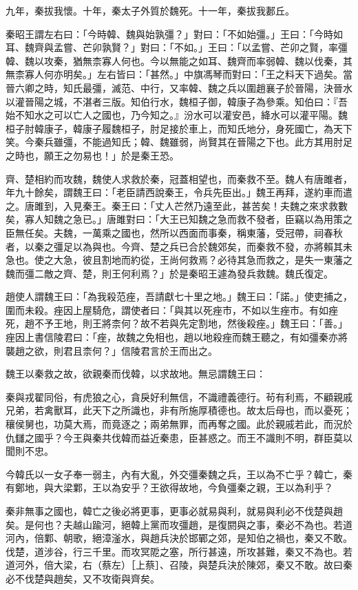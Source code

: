 \begin{pinyinscope}
九年，秦拔我懷。十年，秦太子外質於魏死。十一年，秦拔我郪丘。

秦昭王謂左右曰：「今時韓、魏與始孰彊？」對曰：「不如始彊。」王曰：「今時如耳、魏齊與孟嘗、芒卯孰賢？」對曰：「不如。」王曰：「以孟嘗、芒卯之賢，率彊韓、魏以攻秦，猶無柰寡人何也。今以無能之如耳、魏齊而率弱韓、魏以伐秦，其無柰寡人何亦明矣。」左右皆曰：「甚然。」中旗馮琴而對曰：「王之料天下過矣。當晉六卿之時，知氏最彊，滅范、中行，又率韓、魏之兵以圍趙襄子於晉陽，決晉水以灌晉陽之城，不湛者三版。知伯行水，魏桓子御，韓康子為參乘。知伯曰：『吾始不知水之可以亡人之國也，乃今知之。』汾水可以灌安邑，絳水可以灌平陽。魏桓子肘韓康子，韓康子履魏桓子，肘足接於車上，而知氏地分，身死國亡，為天下笑。今秦兵雖彊，不能過知氏；韓、魏雖弱，尚賢其在晉陽之下也。此方其用肘足之時也，願王之勿易也！」於是秦王恐。

齊、楚相約而攻魏，魏使人求救於秦，冠蓋相望也，而秦救不至。魏人有唐雎者，年九十餘矣，謂魏王曰：「老臣請西說秦王，令兵先臣出。」魏王再拜，遂約車而遣之。唐雎到，入見秦王。秦王曰：「丈人芒然乃遠至此，甚苦矣！夫魏之來求救數矣，寡人知魏之急已。」唐雎對曰：「大王已知魏之急而救不發者，臣竊以為用策之臣無任矣。夫魏，一萬乘之國也，然所以西面而事秦，稱東藩，受冠帶，祠春秋者，以秦之彊足以為與也。今齊、楚之兵已合於魏郊矣，而秦救不發，亦將賴其未急也。使之大急，彼且割地而約從，王尚何救焉？必待其急而救之，是失一東藩之魏而彊二敵之齊、楚，則王何利焉？」於是秦昭王遽為發兵救魏。魏氏復定。

趙使人謂魏王曰：「為我殺范痤，吾請獻七十里之地。」魏王曰：「諾。」使吏捕之，圍而未殺。痤因上屋騎危，謂使者曰：「與其以死痤市，不如以生痤市。有如痤死，趙不予王地，則王將柰何？故不若與先定割地，然後殺痤。」魏王曰：「善。」痤因上書信陵君曰：「痤，故魏之免相也，趙以地殺痤而魏王聽之，有如彊秦亦將襲趙之欲，則君且柰何？」信陵君言於王而出之。

魏王以秦救之故，欲親秦而伐韓，以求故地。無忌謂魏王曰：

秦與戎翟同俗，有虎狼之心，貪戾好利無信，不識禮義德行。茍有利焉，不顧親戚兄弟，若禽獸耳，此天下之所識也，非有所施厚積德也。故太后母也，而以憂死；穰侯舅也，功莫大焉，而竟逐之；兩弟無罪，而再奪之國。此於親戚若此，而況於仇讎之國乎？今王與秦共伐韓而益近秦患，臣甚惑之。而王不識則不明，群臣莫以聞則不忠。

今韓氏以一女子奉一弱主，內有大亂，外交彊秦魏之兵，王以為不亡乎？韓亡，秦有鄭地，與大梁鄴，王以為安乎？王欲得故地，今負彊秦之親，王以為利乎？

秦非無事之國也，韓亡之後必將更事，更事必就易與利，就易與利必不伐楚與趙矣。是何也？夫越山踰河，絕韓上黨而攻彊趙，是復閼與之事，秦必不為也。若道河內，倍鄴、朝歌，絕漳滏水，與趙兵決於邯鄲之郊，是知伯之禍也，秦又不敢。伐楚，道涉谷，行三千里。而攻冥阸之塞，所行甚遠，所攻甚難，秦又不為也。若道河外，倍大梁，右（蔡左）［上蔡］、召陵，與楚兵決於陳郊，秦又不敢。故曰秦必不伐楚與趙矣，又不攻衛與齊矣。


\end{pinyinscope}
